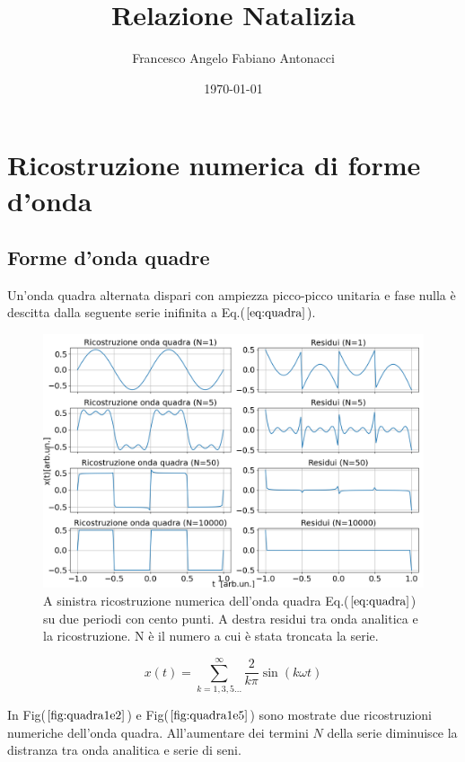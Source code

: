 \documentclass{article}
\author{Francesco Angelo Fabiano Antonacci}
\date{\today}
\title{Relazione Natalizia}
\begin{document}
\maketitle

\section{Ricostruzione numerica di forme d'onda}
    \subsection{Forme d'onda quadre}
    \label{sez:quadra}
        Un'onda quadra alternata dispari con ampiezza picco-picco unitaria e fase nulla è descitta dalla
        seguente serie inifinita a Eq.($\ref{eq:quadra}$).


        \begin{figure}[H]
            \centering
            \includegraphics[width=1\textwidth]{fousquarewave1e2.png} %
            \caption{A sinistra ricostruzione numerica dell'onda quadra Eq.($\ref{eq:quadra}$) su
                    due periodi con cento punti.
                    A destra residui tra onda analitica e la ricostruzione.
                    N è il numero a cui è stata troncata la serie.}
            \label{fig:quadra1e2}
        \end{figure}

        \begin{equation}
            x(t) = \sum_{k=1,3,5...}^{\infty} \frac{2}{k\pi}\sin\left(k\omega t\right)
            \label{eq:quadra}
        \end{equation}

        In Fig($\ref{fig:quadra1e2}$) e Fig($\ref{fig:quadra1e5}$) sono mostrate due ricostruzioni
        numeriche dell'onda quadra.
        All'aumentare dei termini $N$ della serie diminuisce la distranza tra onda analitica e serie 
        di seni.
\end{document}

